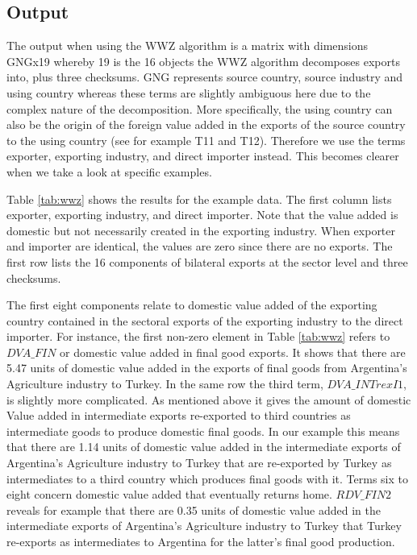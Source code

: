 \documentclass{article}\usepackage[]{graphicx}\usepackage[]{color}
\begin{document}
\subsection{Output}
The output when using the WWZ algorithm is a matrix with dimensions GNGx19 whereby 19 is the 16 objects the WWZ algorithm decomposes exports into, plus three checksums. GNG represents source country, source industry and using country whereas these terms are slightly ambiguous here due to the complex nature of the decomposition. More specifically, the using country can also be the origin of the foreign value added in the exports of the source country to the using country (see for example T11 and T12). Therefore we use the terms exporter, exporting industry, and direct importer instead. This becomes clearer when we take a look at specific examples.

Table \ref{tab:wwz} shows the results for the example data. The first column lists exporter, exporting industry, and direct importer. Note that the value added is domestic but not necessarily created in the exporting industry. When exporter and importer are identical, the values are zero since there are no exports. The first row lists the 16 components of bilateral exports at the sector level and three checksums.

The first eight components relate to domestic value added of the exporting country contained in the sectoral exports of the exporting industry to the direct importer. For instance, the first non-zero element in Table \ref{tab:wwz} refers to $DVA\_FIN$ or domestic value added in final good exports. It shows that there are 5.47 units of domestic value added in the exports of final goods from Argentina's Agriculture industry to Turkey. In the same row the third term,  $DVA\_INTrexI1$, is slightly more complicated. As mentioned above it gives the amount of domestic Value added in intermediate exports re-exported to third countries as intermediate goods to produce domestic final goods. In our example this means that there are 1.14 units of domestic value added in the intermediate exports of Argentina's Agriculture industry to Turkey that are re-exported by Turkey as intermediates to a third country which produces final goods with it. Terms six to eight concern domestic value added that eventually returns home. $RDV\_FIN2$ reveals for example that there are 0.35 units of domestic value added in the intermediate exports of Argentina's Agriculture industry to Turkey that Turkey re-exports as intermediates to Argentina for the latter's final good production.
\end{document}
